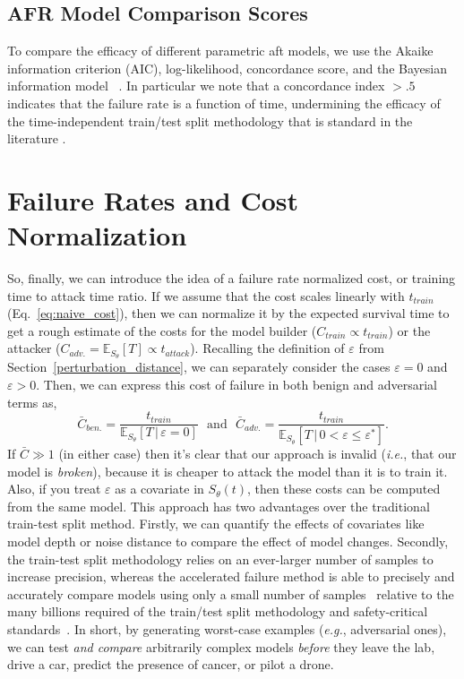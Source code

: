 \subsection{AFR Model Comparison Scores}
\label{metrics}

To compare the efficacy of different parametric aft models, we use the Akaike information criterion (AIC), log-likelihood, concordance score, and the Bayesian information model ~\citep{stoica2004model,taddy2019business}. In particular we note that a concordance index $> .5$ indicates that the failure rate is a function of time, undermining the efficacy of the time-independent train/test split methodology that is standard in the literature \cite{concordance}.





\section{Failure Rates and Cost Normalization}


\label{cost_normalization}


So, finally, we can introduce the idea of a failure rate normalized cost, or training time to attack time ratio. If we assume that the cost scales linearly with $t_{train}$ (Eq.~\ref{eq:naive_cost}), then we can normalize it by the expected survival time to get a rough estimate of the costs for the model builder ($C_{train} \propto t_{train}$) or the attacker ($C_{adv.} = \mathbb{E}_{S_\theta}[T] \propto t_{attack}$). Recalling the definition of $\varepsilon$ from Section~\ref{perturbation_distance}, we can separately consider the cases $\varepsilon=0$ and $\varepsilon > 0$. Then, we can express this cost of failure in both benign and adversarial terms as,
\begin{equation}
	\bar{C}_{ben.} = \frac{t_{train}}{\mathbb{E}_{S_\theta}[T \,|\, \varepsilon = 0] }
	\text{~~and~~}
	\bar{C}_{adv.}=\frac{t_{train}}{\mathbb{E}_{S_\theta}[T \,|\, 0 < \varepsilon \leq \varepsilon^*]}.
	\label{eq:cost}
\end{equation}
If $\bar{C} \gg 1$ (in either case) then it's clear that our approach is invalid (\textit{i.e.}, that our model is \textit{broken}), because it is cheaper to attack the model than it is to train it. Also, if you treat $\varepsilon$ as a covariate in ${S_\theta}(t)$, then these costs can be computed from the same model.
This approach has two advantages over the traditional train-test split method. Firstly, we can quantify the effects of covariates like model depth or noise distance to compare the effect of model changes. Secondly, the train-test split methodology relies on an ever-larger number of samples to increase precision, whereas the accelerated failure method is able to precisely and accurately compare models using only a small number of samples~\cite{schmoor2000sample,lachin1981introduction} relative to the many billions required of the train/test split methodology and safety-critical standards~\cite{iso26262,IEC61508,IEC62034,meyers}.
In short, by generating worst-case examples (\textit{e.g.}, adversarial ones), we can test \textit{and compare} arbitrarily complex models \textit{before} they leave the lab, drive a car, predict the presence of cancer, or pilot a drone.